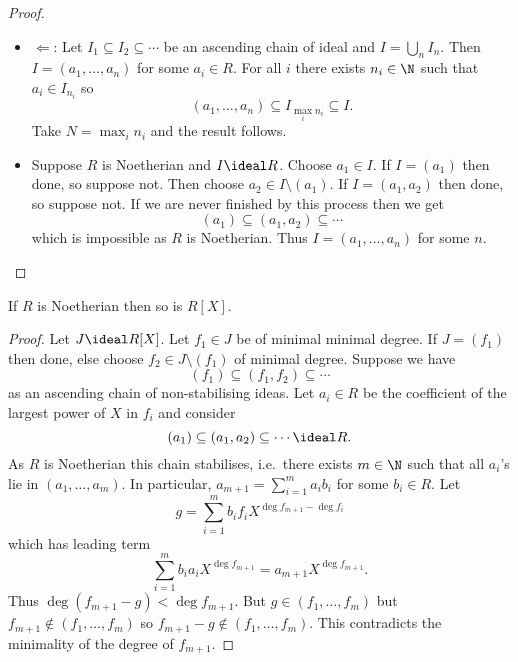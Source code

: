 \documentclass[a4paper]{article}
\theoremstyle{definition}
\begin{document}
\begin{proof}\leavevmode
  \begin{itemize}
  \item \(\Leftarrow\): Let \(I_1 \subseteq I_2 \subseteq \cdots\) be an ascending chain of ideal and \(I = \bigcup_n I_n\). Then \(I = (a_1, \dots, a_n)\) for some \(a_i \in R\). For all \(i\) there exists \(n_i \in \N\) such that \(a_i \in I_{n_i}\) so
    \[
      (a_1, \dots, a_n) \subseteq I_{\max_i n_i} \subseteq I.
    \]
    Take \(N = \max_i n_i\) and the result follows.
  \item Suppose \(R\) is Noetherian and \(I \ideal R\). Choose \(a_1 \in I\). If \(I = (a_1)\) then done, so suppose not. Then choose \(a_2 \in I \setminus (a_1)\). If \(I = (a_1, a_2)\) then done, so suppose not. If we are never finished by this process then we get
    \[
      (a_1) \subseteq (a_1, a_2) \subseteq \cdots
    \]
    which is impossible as \(R\) is Noetherian. Thus \(I = (a_1, \dots, a_n)\) for some \(n\).
  \end{itemize}
\end{proof}

\begin{theorem}
  If \(R\) is Noetherian then so is \(R[X]\).
\end{theorem}

\begin{proof}
  Let \(J \ideal R[X]\). Let \(f_1 \in J\) be of minimal minimal degree. If \(J = (f_1)\) then done, else choose \(f_2 \in J \setminus (f_1)\) of minimal degree. Suppose we have
  \[
    (f_1) \subseteq (f_1, f_2) \subseteq \cdots 
  \]
  as an ascending chain of non-stabilising ideas. Let \(a_i \in R\) be the coefficient of the largest power of \(X\) in \(f_i\) and consider
  \[
    (a_1) \subseteq (a_1, a_2) \subseteq \cdots \ideal R.
  \]
  As \(R\) is Noetherian this chain stabilises, i.e.\ there exists \(m \in \N\) such that all \(a_i\)'s lie in \((a_1, \dots, a_m)\). In particular, \(a_{m + 1} = \sum_{i = 1}^m a_ib_i\) for some \(b_i \in R\). Let
  \[
    g = \sum_{i = 1}^m b_if_iX^{\deg f_{m + 1} - \deg f_i}
  \]
  which has leading term
  \[
    \sum_{i = 1}^m b_ia_iX^{\deg f_{m + 1}} = a_{m + 1}X^{\deg f_{m + 1}}.
  \]
  Thus \(\deg (f_{m + 1} - g) < \deg f_{m + 1}\). But \(g \in (f_1, \dots, f_m)\) but \(f_{m + 1} \notin (f_1, \dots, f_m)\) so \(f_{m + 1} - g \notin (f_1, \dots, f_m)\). This contradicts the minimality of the degree of \(f_{m + 1}\).
\end{proof}
\end{document}
